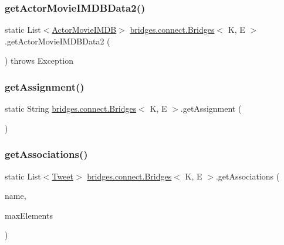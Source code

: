 \subsubsection{\texorpdfstring{get\+Actor\+Movie\+I\+M\+D\+B\+Data2()}{getActorMovieIMDBData2()}}
{\footnotesize\ttfamily static List$<$\hyperlink{classbridges_1_1data__src__dependent_1_1_actor_movie_i_m_d_b}{Actor\+Movie\+I\+M\+DB}$>$ \hyperlink{classbridges_1_1connect_1_1_bridges}{bridges.\+connect.\+Bridges}$<$ K, E $>$.get\+Actor\+Movie\+I\+M\+D\+B\+Data2 (\begin{DoxyParamCaption}{ }\end{DoxyParamCaption}) throws Exception\hspace{0.3cm}{\ttfamily [static]}}

\hypertarget{classbridges_1_1connect_1_1_bridges_ae488b9bf0d696adb7f5a6ba7ce4ff2fd}{}\label{classbridges_1_1connect_1_1_bridges_ae488b9bf0d696adb7f5a6ba7ce4ff2fd} 
\subsubsection{\texorpdfstring{get\+Assignment()}{getAssignment()}}
{\footnotesize\ttfamily static String \hyperlink{classbridges_1_1connect_1_1_bridges}{bridges.\+connect.\+Bridges}$<$ K, E $>$.get\+Assignment (\begin{DoxyParamCaption}{ }\end{DoxyParamCaption})\hspace{0.3cm}{\ttfamily [static]}}

\hypertarget{classbridges_1_1connect_1_1_bridges_ad8f145f95222730fad3c0628b42f0128}{}\label{classbridges_1_1connect_1_1_bridges_ad8f145f95222730fad3c0628b42f0128} 
\subsubsection{\texorpdfstring{get\+Associations()}{getAssociations()}\hspace{0.1cm}{\footnotesize\ttfamily [1/2]}}
{\footnotesize\ttfamily static List$<$\hyperlink{classbridges_1_1data__src__dependent_1_1_tweet}{Tweet}$>$ \hyperlink{classbridges_1_1connect_1_1_bridges}{bridges.\+connect.\+Bridges}$<$ K, E $>$.get\+Associations (\begin{DoxyParamCaption}\item[{\hyperlink{classbridges_1_1data__src__dependent_1_1_twitter_account}{Twitter\+Account}}]{name,  }\item[{int}]{max\+Elements }\end{DoxyParamCaption})\hspace{0.3cm}{\ttfamily [static]}}

